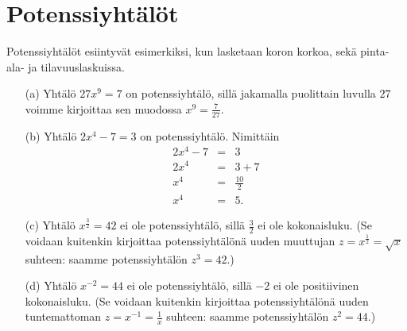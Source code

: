 \chapter{Potenssiyhtälöt}


Potenssiyhtälöt esiintyvät esimerkiksi, kun lasketaan koron korkoa, sekä pinta-ala- ja tilavuuslaskuissa.

\begin{esimerkki}
\begin{enumerate}
\item[(a)]
Yhtälö $27x^9=7$ on potenssiyhtälö, sillä jakamalla puolittain luvulla $27$
voimme kirjoittaa sen muodossa $x^9 = \frac{7}{27}$.
\item[(b)]
Yhtälö $2x^{4}-7=3$ on potenssiyhtälö. Nimittäin
\begin{eqnarray*}
2x^{4} -7 &=& 3 \\
2x^{4} &=& 3+7 \\
x^{4} &=& \frac{10}{2} \\
x^{4} &=& 5.
\end{eqnarray*}
\item[(c)]
Yhtälö $x^{\frac{3}{2}}=42$ ei ole potenssiyhtälö, sillä $\frac{3}{2}$ ei ole kokonaisluku. (Se voidaan kuitenkin kirjoittaa potenssiyhtälönä uuden muuttujan $z=x^{\frac{1}{2}}=\sqrt{x}$ suhteen: saamme potenssiyhtälön $z^3 = 42$.)
\item[(d)]
Yhtälö $x^{-2}=44$ ei ole potenssiyhtälö, sillä $-2$ ei ole positiivinen kokonaisluku. (Se voidaan kuitenkin kirjoittaa potenssiyhtälönä uuden tuntemattoman $z=x^{-1}=\frac{1}{x}$ suhteen: saamme potenssiyhtälön $z^2 = 44$.)
\end{enumerate}
\end{esimerkki}


